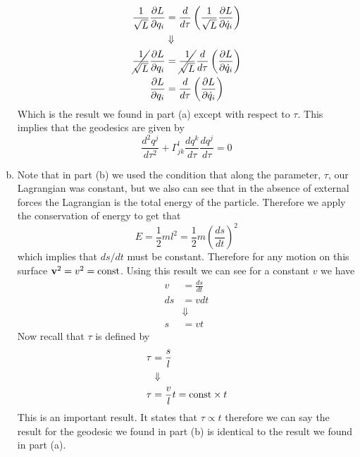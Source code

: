 \documentclass[11pt]{article}
\numberwithin{equation}{section}
\begin{document}
\begin{enumerate}[(a)]
\begin{align*} 
\frac{1}{\sqrt{L}}\frac{\partial L}{\partial q_i} &= \frac{d}{d\tau}\left(\frac{1}{\sqrt{L}}\frac{\partial L}{\partial\dot{q}_i}\right)\\
&\Downarrow\\
\cancel{\frac{1}{\sqrt{L}}}\frac{\partial L}{\partial q_i} &= \cancel{\frac{1}{\sqrt{L}}}\frac{d}{d\tau}\left(\frac{\partial L}{\partial\dot{q}_i}\right)\\
\frac{\partial L}{\partial q_i} &= \frac{d}{d\tau}\left(\frac{\partial L}{\partial\dot{q}_i}\right)
\end{align*} 
Which is the result we found in part (a) except with respect to $\tau$. This implies that the
geodesics are given by
$$\frac{d^2q^j}{d\tau^2} + \Gamma^{l}_{jk}\frac{dq^{k}}{d\tau}\frac{dq^j}{d\tau} = 0$$

\item Note that in part (b) we used the condition that along the parameter, $\tau$, our 
Lagrangian was constant, but we also can see that in the absence of external forces the 
Lagrangian is the total energy of the particle. Therefore we apply the conservation of energy
to get that 
$$E = \frac{1}{2}ml^2 = \frac{1}{2}m\left(\frac{ds}{dt}\right)^2$$
which implies that $ds/dt$ must be constant. Therefore for any motion on this surface 
$\mathbf{v}^2 = v^2 = \textnormal{const}$. Using this result we can see for a constant $v$ 
we have
\begin{align*}
v &= \frac{ds}{dt}\\
ds &= vdt\\
&\Downarrow\\
s &= vt
\end{align*}
Now recall that $\tau$ is defined by
\begin{align*}
\tau &= \frac{s}{l}\\
&\Downarrow\\
\tau &= \frac{v}{l}t = \textnormal{const}\times t
\end{align*}
This is an important result. It states that $\tau\propto{t}$ therefore we can say the result 
for the geodesic we found in part (b) is identical to the result we found in part (a).


\end{enumerate}
\end{document}

